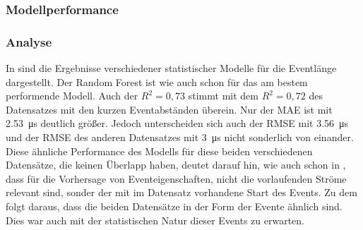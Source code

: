 \subsubsection{Modellperformance}

\begin{table}[h!]
\centering
\caption{Model Performance für die Vorhersage der Eventlänge}
\label{tab:long_event_duration}
\end{table}


\subsubsection{Analyse}
In  sind die Ergebnisse verschiedener statistischer Modelle für die Eventlänge dargestellt. Der Random Forest ist wie auch schon für  das am bestem performende Modell. Auch der \(R^2 = 0,73\) stimmt mit dem \(R^2 = 0,72\) des Datensatzes mit den kurzen Eventabständen überein. Nur der MAE ist mit \SI{2,53}{\micro\second} deutlich größer. Jedoch unterscheiden sich auch der RMSE mit \SI{3,56}{\micro\second} und der RMSE des anderen Datensatzes mit \SI{3}{\micro\second} nicht sonderlich von einander. Diese ähnliche Performance des Modells für diese beiden verschiedenen Datensätze, die keinen Überlapp haben, deutet darauf hin, wie auch schon in , dass für die Vorhersage von Eventeigenschaften, nicht die vorlaufenden Ströme relevant sind, sonder der mit im Datensatz vorhandene Start des Events. Zu dem folgt daraus, dass die beiden Datensätze in der Form der Evente ähnlich sind. Dies war auch mit der statistischen Natur dieser Events zu erwarten.



